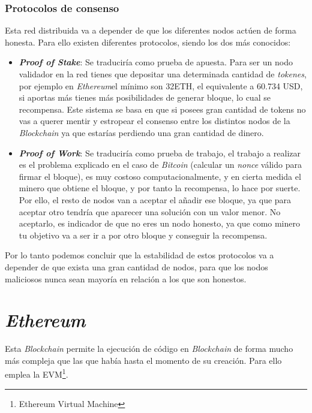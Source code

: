\subsubsection{Protocolos de consenso}
Esta red distribuida va a depender de que los diferentes nodos actúen de forma honesta. Para ello existen diferentes protocolos, siendo los dos más conocidos:
    \begin{itemize}
        \item \textbf{\textit{Proof of Stake}}\cite{eswiki:151478126}: Se traduciría como prueba de apuesta. Para ser un nodo validador en la red tienes que depositar una determinada cantidad de \textit{tokenes}, por ejemplo en \textit{Ethereum}el mínimo son 32ETH, el equivalente a 60.734 USD, si aportas más tienes más posibilidades de generar bloque, lo cual se recompensa. 
        Este sistema se basa en que si posees gran cantidad de tokens no vas a querer mentir y estropear el consenso entre los distintos nodos de la \textit{Blockchain} ya que estarías perdiendo una gran cantidad de dinero.
        \item \textbf{\textit{Proof of Work}}\cite{eswiki:151281808}: Se traduciría como prueba de trabajo, el trabajo a realizar es el problema explicado  en el caso de \textit{Bitcoin} (calcular un \textit{nonce} válido para firmar el bloque), es muy costoso computacionalmente, y en cierta medida el minero que obtiene el bloque, y por tanto la recompensa, lo hace por suerte. Por ello, el resto de nodos van a aceptar el añadir ese bloque, ya que para aceptar otro tendría que aparecer una solución con un valor menor. No aceptarlo, es indicador de que no eres un nodo honesto, ya que como minero tu objetivo va a ser ir a por otro bloque y conseguir la recompensa.
    \end{itemize}

Por lo tanto podemos concluir que la estabilidad de estos protocolos va a depender de que exista una gran cantidad de nodos, para que los nodos maliciosos nunca sean mayoría en relación a los que son honestos.

\section{\textit{Ethereum}}
Esta \textit{Blockchain}\cite{ethereumIntroduccinEthereum} permite la ejecución de código en \textit{Blockchain} de forma mucho más compleja que las que había hasta el momento de su creación. Para ello emplea la EVM\footnote{Ethereum Virtual Machine}.

